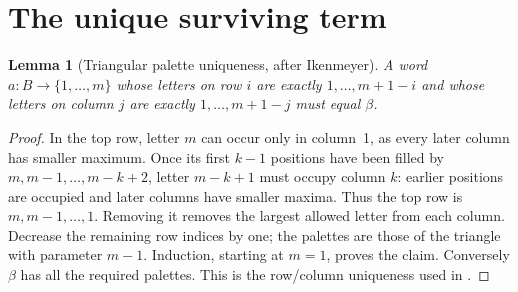 \documentclass[11pt]{article}
\newtheorem{lemma}[theorem]{Lemma}
\numberwithin{equation}{section}
\begin{document}
\section{The unique surviving term}\label{sec:proof}
\begin{lemma}[Triangular palette uniqueness, after Ikenmeyer]\label{lem:palette}
A word $a:B\to\{1,\ldots,m\}$ whose letters on row $i$ are exactly $1,\ldots,m+1-i$ and whose letters on column $j$ are exactly $1,\ldots,m+1-j$ must equal $\beta$.
\end{lemma}
\begin{proof}
In the top row, letter $m$ can occur only in column~1, as every later column has smaller maximum. Once its first $k-1$ positions have been filled by $m,m-1,\ldots,m-k+2$, letter $m-k+1$ must occupy column $k$: earlier positions are occupied and later columns have smaller maxima. Thus the top row is $m,m-1,\ldots,1$. Removing it removes the largest allowed letter from each column. Decrease the remaining row indices by one; the palettes are those of the triangle with parameter $m-1$. Induction, starting at $m=1$, proves the claim. Conversely $\beta$ has all the required palettes. This is the row/column uniqueness used in \cite[Section~5, equation~(5.2)]{Ik}.
\end{proof}
\end{document}
